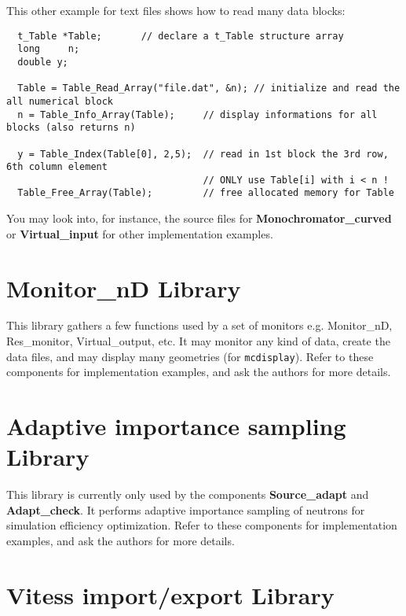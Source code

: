 This other example for text files shows how to read many data blocks:
\begin{lstlisting}
  t_Table *Table;       // declare a t_Table structure array
  long     n;
  double y;

  Table = Table_Read_Array("file.dat", &n); // initialize and read the all numerical block
  n = Table_Info_Array(Table);     // display informations for all blocks (also returns n)

  y = Table_Index(Table[0], 2,5);  // read in 1st block the 3rd row, 6th column element
                                   // ONLY use Table[i] with i < n !
  Table_Free_Array(Table);         // free allocated memory for Table
\end{lstlisting}

You may look into, for instance, the source files for
\textbf{Monochromator\_curved} or \textbf{Virtual\_input}
for other implementation examples.

\section{Monitor\_nD Library}

This library gathers a few functions used by a set of monitors e.g. Monitor\_nD, Res\_monitor, Virtual\_output, etc.
It may monitor any kind of data, create the data files, and may display many geometries (for \verb+mcdisplay+).
Refer to these components for implementation examples, and ask the authors for more details.

\section{Adaptive importance sampling Library}

This library is currently only used by the components \textbf{Source\_adapt}
and \textbf{Adapt\_check}. It performs adaptive importance sampling of neutrons for simulation efficiency optimization.
Refer to these components for implementation examples, and ask the authors for more details.

\section{Vitess import/export Library}

